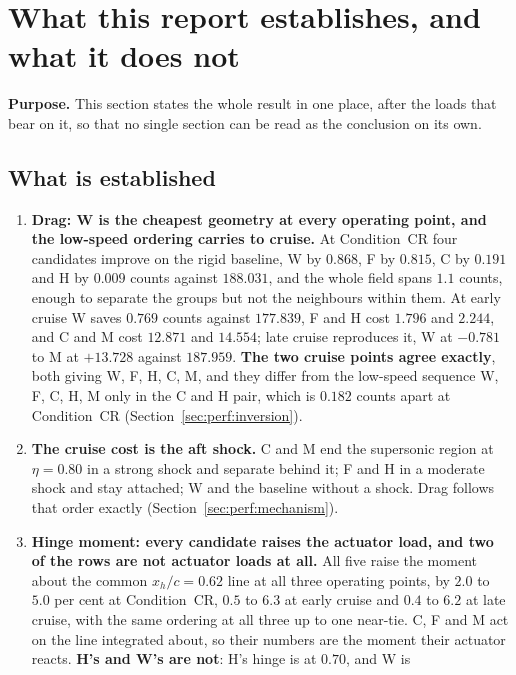 \section{What this report establishes, and what it does not}
\label{sec:concl}

\textbf{Purpose.} This section states the whole result in one place, after the loads that bear on
it, so that no single section can be read as the conclusion on its own.

\subsection{What is established}
\label{sec:concl:established}

\begin{enumerate}
  \item \textbf{Drag: W is the cheapest geometry at every operating point, and the low-speed
    ordering carries to cruise.} At Condition~CR four candidates improve on the rigid baseline,
    W by $0.868$, F by $0.815$, C by $0.191$ and H by $0.009$ counts against $188.031$, and the
    whole field spans $1.1$ counts, enough to separate the groups but not the neighbours within
    them. At early cruise W saves $0.769$ counts against $177.839$, F and H cost $1.796$ and
    $2.244$, and C and M cost $12.871$ and $14.554$; late cruise reproduces it, W at $-0.781$ to
    M at $+13.728$ against $187.959$. \textbf{The two cruise points agree exactly}, both giving W,
    F, H, C, M, and they differ from the low-speed sequence W, F, C, H, M only in the C and H pair,
    which is $0.182$ counts apart at Condition~CR (Section~\ref{sec:perf:inversion}).
  \item \textbf{The cruise cost is the aft shock.} C and M end the supersonic region at
    $\eta = 0.80$ in a strong shock and separate behind it; F and H in a moderate shock and stay
    attached; W and the baseline without a shock. Drag follows that order exactly
    (Section~\ref{sec:perf:mechanism}).
  \item \textbf{Hinge moment: every candidate raises the actuator load, and two of the rows are
    not actuator loads at all.} All five raise the moment about the common $x_h/c = 0.62$ line at
    all three operating points, by $2.0$ to $5.0$ per cent at Condition~CR, $0.5$ to $6.3$ at
    early cruise and $0.4$ to $6.2$ at late cruise, with the same ordering at all three up to one
    near-tie. C, F and M act on the line integrated about, so their numbers are the
    moment their actuator reacts. \textbf{H's and W's are not}: H's hinge is at $0.70$, and W is

\end{enumerate}
